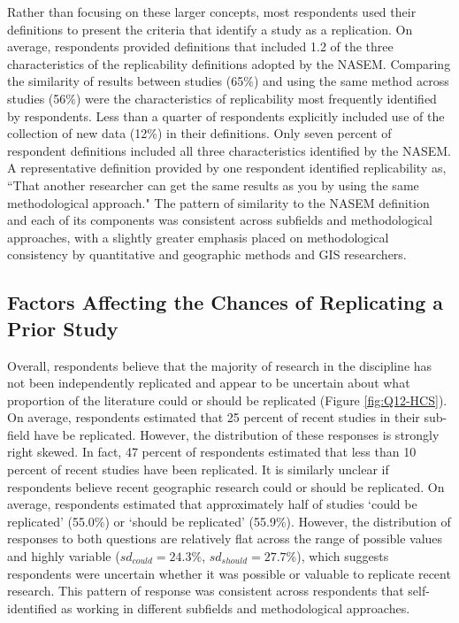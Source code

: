 \documentclass[]{interact}
\theoremstyle{plain}%
\theoremstyle{definition}
\theoremstyle{remark}
\begin{document}
Rather than focusing on these larger concepts, most respondents used their definitions to present the criteria that identify a study as a replication.
On average, respondents provided definitions that included 1.2 of the three characteristics of the replicability definitions adopted by the NASEM.
Comparing the similarity of results between studies (65\%) and using the same method across studies (56\%) were the characteristics of replicability most frequently identified by respondents.
Less than a quarter of respondents explicitly included use of the collection of new data (12\%) in their definitions.
Only seven percent of respondent definitions included all three characteristics identified by the NASEM.
A representative definition provided by one respondent identified replicability as, ``That another researcher can get the same results as you by using the same methodological approach."
The pattern of similarity to the NASEM definition and each of its components was consistent across subfields and methodological approaches, with a slightly greater emphasis placed on methodological consistency by quantitative and geographic methods and GIS researchers.

\subsection*{Factors Affecting the Chances of Replicating a Prior Study}
Overall, respondents believe that the majority of research in the discipline has not been independently replicated and appear to be uncertain about what proportion of the literature could or should be replicated (Figure \ref{fig:Q12-HCS}). 
On average, respondents estimated that 25 percent of recent studies in their sub-field have be replicated. 
However, the distribution of these responses is strongly right skewed.
In fact, 47 percent of respondents estimated that less than 10 percent of recent studies have been replicated.
It is similarly unclear if respondents believe recent geographic research could or should be replicated.
On average, respondents estimated that approximately half of studies `could be replicated' (55.0\%) or `should be replicated' (55.9\%). 
However, the distribution of responses to both questions are relatively flat across the range of possible values and highly variable (\textit{$sd_{could}=24.3\%$}, \textit{$sd_{should}=27.7\%$}), which suggests 
respondents were uncertain whether it was possible or valuable to replicate recent research.  
This pattern of response was consistent across respondents that self-identified as working in different subfields and methodological approaches.
\end{document}
